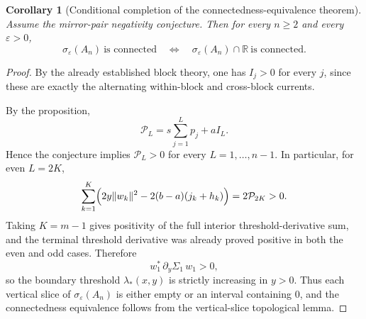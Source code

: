 \documentclass[11pt]{article}
\newtheorem{corollary}[theorem]{Corollary}
\newcommand{\R}{\mathbb R}
\newcommand{\eps}{\varepsilon}
\begin{document}
\begin{corollary}[Conditional completion of the connectedness-equivalence theorem]
Assume the mirror-pair negativity conjecture. Then for every \(n\ge 2\) and every \(\eps>0\),
\[
\sigma_\eps(A_n)\ \text{is connected}
\quad\Longleftrightarrow\quad
\sigma_\eps(A_n)\cap\R\ \text{is connected}.
\]
\end{corollary}

\begin{proof}
By the already established block theory, one has \(I_j>0\) for every \(j\), since these are
exactly the alternating within-block and cross-block currents.

By the proposition,
\[
\mathcal P_L
=
s\sum_{j=1}^L p_j + a I_L.
\]
Hence the conjecture implies \(\mathcal P_L>0\) for every \(L=1,\dots,n-1\). In particular,
for even \(L=2K\),
\[
\sum_{k=1}^K\Bigl(2y\|w_k\|^2-2(b-a)(j_k+h_k)\Bigr)=2\mathcal P_{2K}>0.
\]
Taking \(K=m-1\) gives positivity of the full interior threshold-derivative sum, and the
terminal threshold derivative was already proved positive in both the even and odd cases.
Therefore
\[
w_1^*\,\partial_y\Sigma_1\,w_1>0,
\]
so the boundary threshold \(\lambda_*(x,y)\) is strictly increasing in \(y>0\). Thus each
vertical slice of \(\sigma_\eps(A_n)\) is either empty or an interval containing \(0\), and the
connectedness equivalence follows from the vertical-slice topological lemma.
\end{proof}
\end{document}
